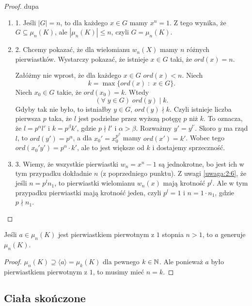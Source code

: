 \begin{proof}{\color{pagColor}dupa}

\begin{enumerate}
\item 1. Jeśli $|G|=n$, to dla każdego $x\in G$ mamy $x^n=1$. Z tego wynika, że $G\subseteq \mu_n(K)$, ale $|\mu_n(K)|\leq n$, czyli $G=\mu_n(K)$.

\item 2. Chcemy pokazać, że dla wielomianu $w_n(X)$ mamy $n$ różnych pierwiastków. Wystarczy pokazać, że istnieje $x\in G$ taki, że $ord(x)=n$.

Załóżmy nie wprost, że dla każdego $x\in G$ $ord(x)<n$. Niech 
$$k=\max\{ord(x)\;:\;x\in G\}.$$ 
Niech $x_0\in G$ takie, że $ord(x_0)=k$. Wtedy 
$$(\forall\;y\in G)\;ord(y)\;|\;k.$$ 
Gdyby tak nie było, to istniałby $y\in G$, $ord(y)\nmid k$. Czyli istnieje liczba pierwsza $p$ taka, że $l$ jest podzielne przez wyższą potęgę $p$ niż $k$. To oznacza, że $l=p^{\alpha}l'$ i $k=p^\beta k'$, gdzie $p\nmid l'$ i $\alpha>\beta$. Rozważmy $y'=y^{l'}$. Skoro $y$ ma rząd $l$, to $ord(y')=p^\alpha$, a dla $x_0'=x_0^{p^\beta}$ mamy $ord(x')=k'$. Wobec tego $ord(x_0'y')=p^\alpha\cdot k'$, ale to jest większe od $k$ i dostajemy sprzeczność.



\item 3. Wiemy, że wszystkie pierwiastki $w_n=x^n-1$ są jednokrotne, bo jest ich w tym przypadku dokładnie $n$ (z poprzedniego punktu). Z uwagi \ref{uwaga:2:6}, że jeśli $n=p^ln_1$, to pierwiastki wielomianu $w_n(x)$ mają krotność $p^l$. Ale w tym przypadku pierwiastki mają krotność jeden, czyli $p^l=1$ i $n=1\cdot n_1$, gdzie $p\nmid n_1$.
\end{enumerate}
\end{proof}

\begin{conclusion}
    Jeśli $a\in \mu_n(K)$ jest pierwiastkiem pierwotnym z $1$ stopnia $n>1$, to $a$ generuje $\mu_n(K)$.
\end{conclusion}

\begin{proof}

$\mu_n(K)\supseteq\langle a\rangle =\mu_k(K)$ dla pewnego $k\in\mathbb{N}$. Ale ponieważ $a$ było pierwiastkiem pierwotnym z $1$, to musimy mieć $n=k$.
\end{proof}

\subsection{Ciała skończone}

